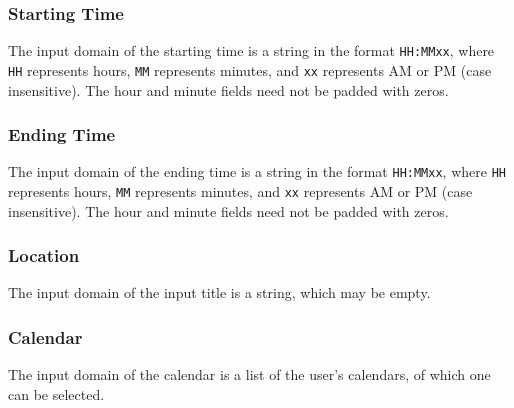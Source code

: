 \documentclass[10pt,letterpaper]{article}
\begin{document}
\subsubsection{Starting Time}
The input domain of the starting time is a string in the format \texttt{HH:MMxx}, where \texttt{HH} represents hours, \texttt{MM} represents minutes, and \texttt{xx} represents AM or PM (case insensitive). The hour and minute fields need not be padded with zeros.

\subsubsection{Ending Time}
The input domain of the ending time is a string in the format \texttt{HH:MMxx}, where \texttt{HH} represents hours, \texttt{MM} represents minutes, and \texttt{xx} represents AM or PM (case insensitive). The hour and minute fields need not be padded with zeros.

\subsubsection{Location}
The input domain of the input title is a string, which may be empty.

\subsubsection{Calendar}
The input domain of the calendar is a list of the user's calendars, of which one can be selected.

\newpage
\end{document}
